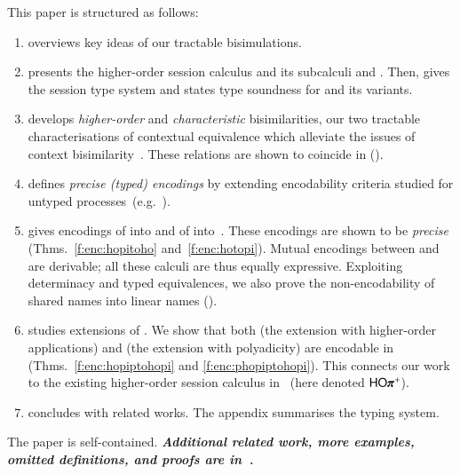  This paper 
is structured as follows:
\begin{enumerate}[$\bullet$]
\item {} overviews key ideas of our tractable bisimulations.
\item {} presents the higher-order session calculus \HOp and its 
subcalculi \HO and \sessp.  Then,  gives the session type system
and states type soundness for \HOp and its variants.
\item {} 
develops \emph{higher-order} and \emph{characteristic} bisimilarities, our two
tractable characterisations of contextual equivalence which 
alleviate the issues of context bisimilarity~\cite{San96H}. These 
relations are shown to coincide in \HOp ().
\item {} defines \emph{precise (typed) encodings} by extending encodability criteria 
studied for
untyped processes~(e.g.~\cite{DBLP:journals/iandc/Gorla10,DBLP:conf/icalp/LanesePSS10}).
\item {} %
gives encodings of \HOp into \HO and of \HOp into~\sessp.
These encodings 
are shown to be \emph{precise} (Thms.~\ref{f:enc:hopitoho} and~\ref{f:enc:hotopi}).
Mutual encodings between \sessp and \HO are derivable; 
all these calculi are thus equally expressive.
Exploiting determinacy and typed equivalences,
we also prove the non-encodability of shared names
into linear names ().

\item {} studies extensions of \HOp. We show that 
both \HOpp (the extension with higher-order applications) 
and \pHOp (the extension with polyadicity) are encodable in \HOp
(Thms.~\ref{f:enc:hopiptohopi} and \ref{f:enc:phopiptohopi}).
This connects our work 
to the existing
higher-order session calculus in~\cite{tlca07} (here denoted  $\PHOpp$).

\item {} concludes with related works. The appendix summarises the typing system. 
\end{enumerate}
\noi
The paper is self-contained. 
{\bf\em Additional related work, more examples, omitted definitions, and  proofs 
are 
in~\cite{KouzapasPY15}.} 

